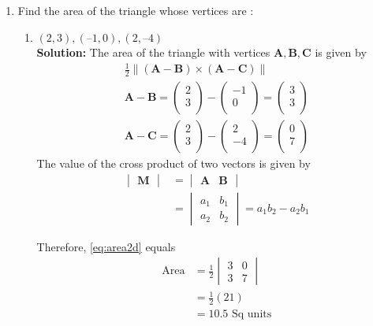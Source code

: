 \documentclass[12pt]{article}
\newcommand{\mydet}[1]{\ensuremath{\begin{vmatrix}#1\end{vmatrix}}}
\providecommand{\brak}[1]{\ensuremath{\left(#1\right)}}
\providecommand{\norm}[1]{\left\lVert#1\right\rVert}
\newcommand{\solution}{\noindent \textbf{Solution: }}
\newcommand{\myvec}[1]{\ensuremath{\begin{pmatrix}#1\end{pmatrix}}}
\let\vec\mathbf
\begin{document}
\begin{enumerate}
\item Find the area of the triangle whose vertices are :
\begin{enumerate}
\item $(2, 3), (–1, 0), (2, – 4)$  \\
\solution The area of the triangle with vertices $\vec{A}, \vec{B}, \vec{C}$ is given by  
  \label{prop:area2d}
  \begin{align}
    \label{eq:area2d}
	\frac{1}{2}\norm{\brak{\vec{A}-\vec{B}} \times \brak{\vec{A}-\vec{C}}} \\
	 \vec{A}-\vec{B} =  \myvec{
  2 \\
  3 \\
 } - \myvec{
  -1 \\
  0 \\
 } = \myvec{
 3 \\
 3 \\
 }
 \\
 \vec{A}-\vec{C} =  \myvec{
  2 \\
  3 \\
 } - \myvec{
  2 \\
  -4 \\
 } = \myvec{
 0 \\
 7 \\
 }
 \end{align}
The value of the cross product of two vectors is given by
\begin{align}
  \label{eq:det2d}
  \mydet{\vec{M}} &= \mydet{\vec{A} & \vec{B}} 
  \\
  &= \mydet{a_1 & b_1\\a_2 & b_2} = a_1b_2 - a_2 b_1
\end{align}

		Therefore, \eqref{eq:area2d} equals \\
\begin{align}
	\text{Area} &=	\frac{1}{2}\mydet{3 & 0\\3 & 7}  \\
	&=	\frac{1}{2}\brak{21}  \\
	&=10.5 \text{ Sq units}	       
\end{align}


\end{enumerate}
\end{enumerate}
\end{document}
